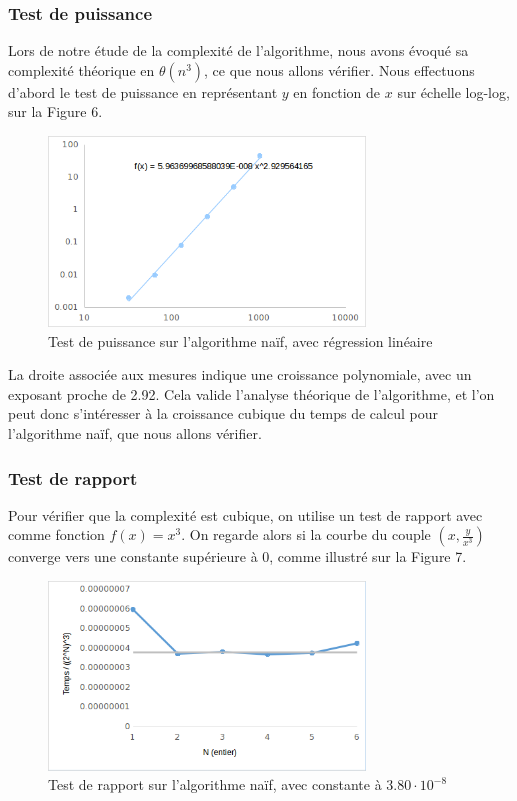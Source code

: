\documentclass[10pt,a4paper]{article}
\begin{document}
\subsubsection{Test de puissance}

Lors de notre étude de la complexité de l'algorithme, nous avons évoqué sa complexité théorique en $ \theta (n^{3}) $, ce que nous allons vérifier. Nous effectuons d'abord le test de puissance en représentant $ y $ en fonction de $ x $ sur échelle log-log, sur la Figure 6.

\begin{figure}[h!]
	\centering
	\includegraphics[width=0.75\textwidth]{spreadsheet/graph5}
	\caption{Test de puissance sur l'algorithme naïf, avec régression linéaire}
\end{figure}

La droite associée aux mesures indique une croissance polynomiale, avec un exposant proche de 2.92. Cela valide l'analyse théorique de l'algorithme, et l'on peut donc s'intéresser à la croissance cubique du temps de calcul pour l'algorithme naïf, que nous allons vérifier. 

\subsubsection{Test de rapport}

Pour vérifier que la complexité est cubique, on utilise un test de rapport avec comme fonction $ f(x) = x^{3} $. On regarde alors si la courbe du couple $ (x,  \frac{y}{x^{3}}) $ converge vers une constante supérieure à 0, comme illustré sur la Figure 7.

\newpage

\begin{figure}[h!]
	\centering
	\includegraphics[width=0.75\textwidth]{spreadsheet/graph7}
	\caption{Test de rapport sur l'algorithme naïf, avec constante à $ 3.80 \cdot 10^{-8} $}
\end{figure}
\end{document}
